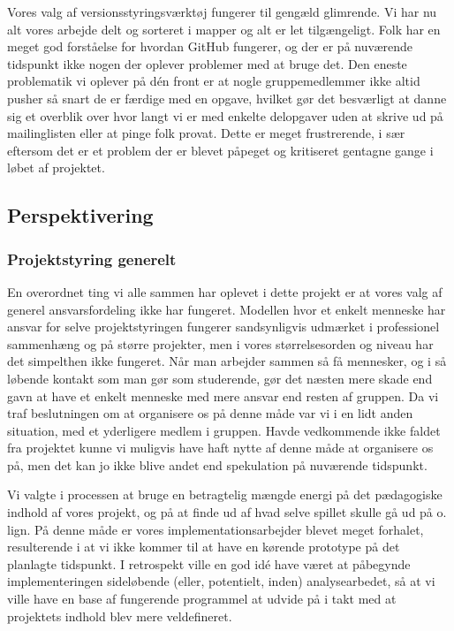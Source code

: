 \documentclass[10pt,a4paper,danish]{article}
\begin{document}
Vores valg af versionsstyringsværktøj fungerer til gengæld glimrende. Vi har nu alt vores
arbejde delt og sorteret i mapper og alt er let tilgængeligt. Folk har en meget
god forståelse for hvordan GitHub fungerer, og der er på nuværende tidspunkt ikke
nogen der oplever problemer med at bruge det. Den eneste problematik vi oplever 
på dén front er at nogle gruppemedlemmer ikke altid pusher så snart de er færdige 
med en opgave, hvilket gør det besværligt at danne sig et overblik over hvor langt 
vi er med enkelte delopgaver uden at skrive ud på mailinglisten eller at pinge folk
provat. Dette er meget frustrerende, i sær eftersom det er et problem der er blevet
påpeget og kritiseret gentagne gange i løbet af projektet. 

\subsection{Perspektivering}
\subsubsection{Projektstyring generelt}
En overordnet ting vi alle sammen har oplevet i dette projekt er at vores valg
af generel ansvarsfordeling ikke har fungeret. Modellen hvor et enkelt menneske
har ansvar for selve projektstyringen fungerer sandsynligvis udmærket i professionel
sammenhæng og på større projekter, men i vores størrelsesorden og niveau har det
simpelthen ikke fungeret. Når man arbejder sammen så få mennesker, og i så løbende 
kontakt som man gør som studerende, gør det næsten mere skade end gavn at have et 
enkelt menneske med mere ansvar end resten af gruppen. Da vi traf beslutningen om 
at organisere os på denne måde var vi i en lidt anden situation, med et yderligere 
medlem i gruppen. Havde vedkommende ikke faldet fra projektet kunne vi muligvis
have haft nytte af denne måde at organisere os på, men det kan jo ikke blive andet
end spekulation på nuværende tidspunkt. 

Vi valgte i processen at bruge en betragtelig mængde energi på det pædagogiske indhold
af vores projekt, og på at finde ud af hvad selve spillet skulle gå ud på o. lign. På 
denne måde er vores implementationsarbejder blevet meget forhalet, resulterende i at
vi ikke kommer til at have en kørende prototype på det planlagte tidspunkt. I retrospekt
ville en god idé have været at påbegynde implementeringen sideløbende (eller, potentielt, 
inden) analysearbedet, så at vi ville have en base af fungerende programmel at udvide
på i takt med at projektets indhold blev mere veldefineret. 
\end{document}
